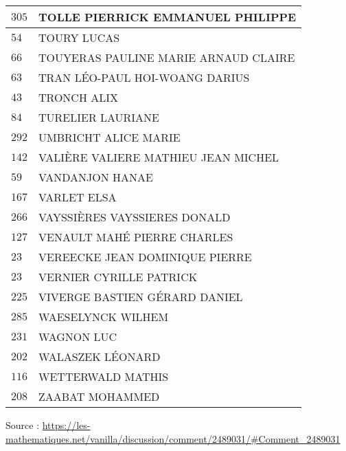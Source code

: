 \begin{xltabular}{\linewidth}{|l|X|}
    \hline
    $305$ & TOLLE PIERRICK EMMANUEL PHILIPPE \\
    \hline
    $54$ & TOURY LUCAS \\
    \hline
    $66$ & TOUYERAS PAULINE MARIE ARNAUD CLAIRE \\
    \hline
    $63$ & TRAN LÉO-PAUL HOI-WOANG DARIUS \\
    \hline
    $43$ & TRONCH ALIX \\
    \hline
    $84$ & TURELIER LAURIANE \\
    \hline
    $292$ & UMBRICHT ALICE MARIE \\
    \hline
    $142$ & VALIÈRE VALIERE MATHIEU JEAN MICHEL \\
    \hline
    $59$ & VANDANJON HANAE \\
    \hline
    $167$ & VARLET ELSA \\
    \hline
    $266$ & VAYSSIÈRES VAYSSIERES DONALD \\
    \hline
    $127$ & VENAULT MAHÉ PIERRE CHARLES \\
    \hline
    $23$ & VEREECKE JEAN DOMINIQUE PIERRE \\
    \hline
    $23$ & VERNIER CYRILLE PATRICK \\
    \hline
    $225$ & VIVERGE BASTIEN GÉRARD DANIEL \\
    \hline
    $285$ & WAESELYNCK WILHEM \\
    \hline
    $231$ & WAGNON LUC \\
    \hline
    $202$ & WALASZEK LÉONARD \\
    \hline
    $116$ & WETTERWALD MATHIS \\
    \hline
    $208$ & ZAABAT MOHAMMED \\
    \hline
  \end{xltabular}

  \begin{flushright}
    {\tiny Source : \url{https://les-mathematiques.net/vanilla/discussion/comment/2489031/\#Comment_2489031}}
  \end{flushright}

